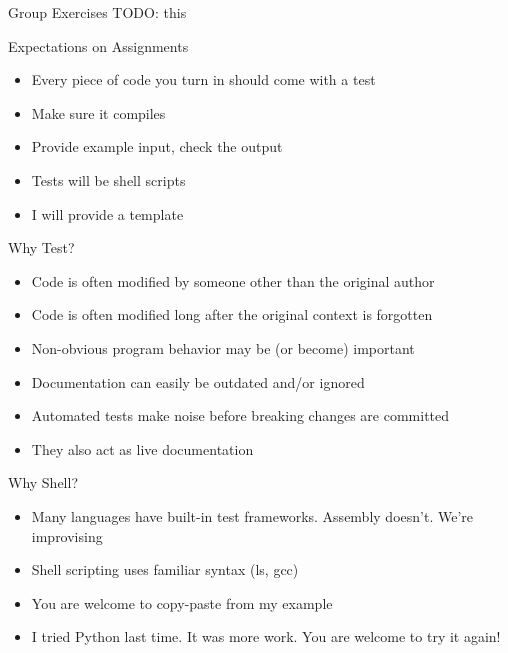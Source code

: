 \begin{frame}{Group Exercises}
TODO: this
\end{frame}


\begin{frame}{Expectations on Assignments}
	\begin{itemize}
		\item Every piece of code you turn in should come with a test
		\item Make sure it compiles
		\item Provide example input, check the output
		\item Tests will be shell scripts
		\item I will provide a template
	\end{itemize}
\end{frame}

\begin{frame}{Why Test?}
	\begin{itemize}
		\item Code is often modified by someone other than the original author
		\item Code is often modified long after the original context is forgotten
		\item Non-obvious program behavior may be (or become) important
		\item Documentation can easily be outdated and/or ignored
		\item Automated tests make noise before breaking changes are committed
		\item They also act as live documentation
	\end{itemize}
\end{frame}


\begin{frame}{Why Shell?}
	\begin{itemize}
		\item Many languages have built-in test frameworks. Assembly doesn't. We're improvising
		\item Shell scripting uses familiar syntax (ls, gcc)
		\item You are welcome to copy-paste from my example
		\item I tried Python last time. It was more work. You are welcome to try it again!
	\end{itemize}
\end{frame}



